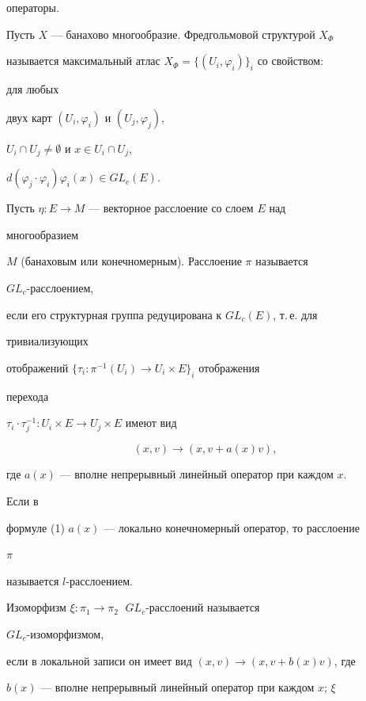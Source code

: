 операторы. 


 


Пусть $X$ --- банахово многообразие. Фредгольмовой структурой $X_\Phi$ 


называется максимальный атлас $X_\Phi=\{(U_i,\varphi_i)\}_i$ со свойством: 


для любых 


двух карт $(U_i,\varphi_i)$ и $(U_j,\varphi_j)$, 


$U_i\cap U_j\ne\emptyset$ и $x\in U_i\cap U_j$, 


$d(\varphi_j\cdot\varphi_i)\varphi_i(x)\in GL_c(E)$.


 


Пусть $\eta:E\to M$ --- векторное расслоение со слоем $E$ над 


многообразием 


$M$ (банаховым или конечномерным). Расслоение $\pi$ называется 


$GL_c$-расслоением, 


если его структурная группа редуцирована к $GL_c(E)$, т.\,е. для 


тривиализующих 


отображений $\{\tau_i:\pi^{-1}(U_i)\to U_i\times E\}_i$ отображения 


перехода 


$\tau_i\cdot\tau_j^{-1}:U_i\times E\to U_j\times E$ имеют вид 


\begin{equation} 


(x,v)\to(x,v+a(x)v), 


\end{equation} 


где $a(x)$ --- вполне непрерывный линейный оператор при каждом $x$. 


 Если в 


формуле (1) $a(x)$ --- локально конечномерный оператор, то расслоение 


$\pi$ 


называется $l$-расслоением. 


 


Изоморфизм $\xi:\pi_1\to\pi_2\;$ $GL_c$-расслоений называется 


$GL_c$-изоморфизмом, 


если в локальной записи он имеет вид $(x,v)\to(x,v+b(x)v)$, где 


$b(x)$ --- вполне непрерывный линейный оператор при каждом $x$; $\xi$ 



